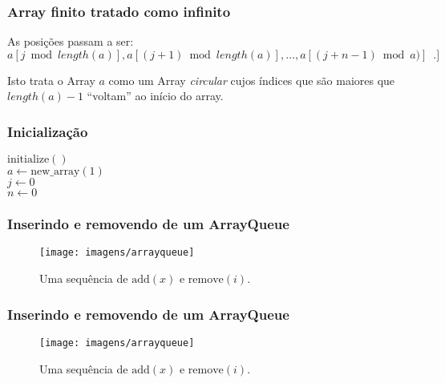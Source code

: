 \documentclass{beamer}
\begin{document}
\begin{frame}
\frametitle{Array finito tratado como infinito}

As posições passam  a ser:
 $a[j \bmod length(a)],a[(j+1) \bmod length(a)],\ldots,a[(j+n-1) \bmod a)]
\enspace.]$

Isto trata o Array $a$ como um Array \emph{circular}
cujos índices que são maiores que $length(a)-1$ ``voltam'' ao início do array.
\end{frame}

\begin{frame}
\frametitle{Inicialização}
\begin{oframed}
\begin{flushleft}
\hspace*{1em} $\ensuremath{\mathrm{initialize}()}$\\
\hspace*{1em} \hspace*{1em} $\ensuremath{\ensuremath{\mathit{a}} \gets  \ensuremath{\mathrm{new\_array}(1)}}$\\
\hspace*{1em} \hspace*{1em} $\ensuremath{\ensuremath{\mathit{j}} \gets  \ensuremath{0}}$\\
\hspace*{1em} \hspace*{1em} $\ensuremath{\ensuremath{\mathit{n}} \gets  \ensuremath{0}}$\\
\end{flushleft}
\end{oframed}
\end{frame}

\begin{frame}
\frametitle{Inserindo e removendo de um ArrayQueue}
\begin{figure}
  \begin{center}
    \texttt{[image: imagens/arrayqueue]}
  \end{center}
  \caption[Inserindo e removendo de um ArrayQueue]{Uma sequência de $\ensuremath{\ensuremath{\mathrm{add}(\ensuremath{\mathit{x}})}}$ e $\ensuremath{\ensuremath{\mathrm{remove}(\ensuremath{\mathit{i}})}}$.}
\end{figure}
\end{frame}

\begin{frame}
\frametitle{Inserindo e removendo de um ArrayQueue}
\begin{figure}
  \begin{center}
    \texttt{[image: imagens/arrayqueue]}
  \end{center}
 \caption[Inserindo e removendo de um ArrayQueue]{Uma sequência de $\ensuremath{\ensuremath{\mathrm{add}(\ensuremath{\mathit{x}})}}$ e $\ensuremath{\ensuremath{\mathrm{remove}(\ensuremath{\mathit{i}})}}$.}
\end{figure}
\end{frame}
\end{document}
